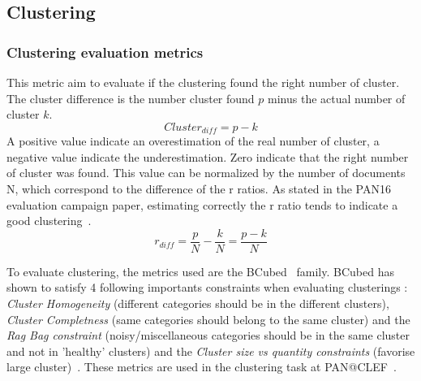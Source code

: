 \subsection{Clustering}

\subsubsection{Clustering evaluation metrics}

\begin{definition}
  This metric aim to evaluate if the clustering found the right number of cluster.
  The cluster difference is the number cluster found $p$ minus the actual number of cluster $k$.
  \begin{equation}
    Cluster_{diff} = p - k
  \end{equation}
  A positive value indicate an overestimation of the real number of cluster, a negative value indicate the underestimation.
  Zero indicate that the right number of cluster was found.
  This value can be normalized by the number of documents N, which correspond to the difference of the r ratios.
  As stated in the PAN16 evaluation campaign paper, estimating correctly the r ratio tends to indicate a good clustering~\cite{pan16}.
  \begin{equation}
    r_{diff} = \frac{p}{N} - \frac{k}{N} = \frac{p - k}{N}
  \end{equation}
\end{definition}

To evaluate clustering, the metrics used are the BCubed~\cite{bcubed} family.
BCubed has shown to satisfy 4 following importants constraints when evaluating clusterings : \textit{Cluster Homogeneity} (different categories should be in the different clusters), \textit{Cluster Completness} (same categories should belong to the same cluster) and the \textit{Rag Bag constraint} (noisy/miscellaneous categories should be in the same cluster and not in 'healthy' clusters) and the \textit{Cluster size vs quantity constraints} (favorise large cluster)~\cite{bcubed}.
These metrics are used in the clustering task at PAN@CLEF~\cite{pan16}.

